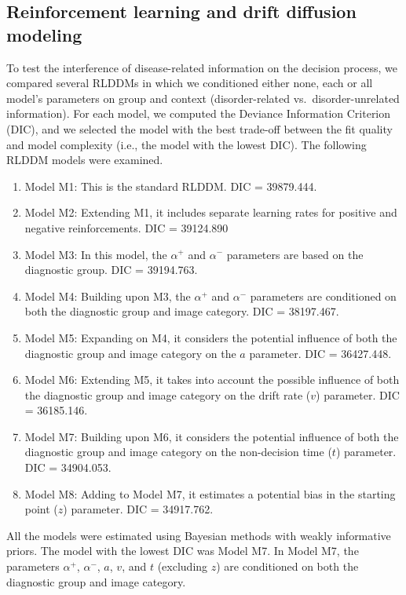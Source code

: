 \documentclass[
  man,floatsintext]{apa6}
\providecommand{\tightlist}{%
  \setlength{\itemsep}{0pt}\setlength{\parskip}{0pt}}
\begin{document}
\hypertarget{reinforcement-learning-and-drift-diffusion-modeling}{%
\subsection{Reinforcement learning and drift diffusion modeling}\label{reinforcement-learning-and-drift-diffusion-modeling}}

To test the interference of disease-related information on the decision process, we compared several RLDDMs in which we conditioned either none, each or all model's parameters on group and context (disorder-related vs.~disorder-unrelated information). For each model, we computed the Deviance Information Criterion (DIC), and we selected the model with the best trade-off between the fit quality and model complexity (i.e., the model with the lowest DIC). The following RLDDM models were examined.

\begin{enumerate}
\def\labelenumi{\arabic{enumi}.}
\tightlist
\item
  Model M1: This is the standard RLDDM. DIC = 39879.444.
\item
  Model M2: Extending M1, it includes separate learning rates for positive and negative reinforcements. DIC = 39124.890
\item
  Model M3: In this model, the \(\alpha^+\) and \(\alpha^-\) parameters are based on the diagnostic group. DIC = 39194.763.
\item
  Model M4: Building upon M3, the \(\alpha^+\) and \(\alpha^-\) parameters are conditioned on both the diagnostic group and image category. DIC = 38197.467.
\item
  Model M5: Expanding on M4, it considers the potential influence of both the diagnostic group and image category on the \(a\) parameter. DIC = 36427.448.
\item
  Model M6: Extending M5, it takes into account the possible influence of both the diagnostic group and image category on the drift rate (\(v\)) parameter. DIC = 36185.146.
\item
  Model M7: Building upon M6, it considers the potential influence of both the diagnostic group and image category on the non-decision time (\(t\)) parameter. DIC = 34904.053.
\item
  Model M8: Adding to Model M7, it estimates a potential bias in the starting point (\(z\)) parameter. DIC = 34917.762.
\end{enumerate}

All the models were estimated using Bayesian methods with weakly informative priors. The model with the lowest DIC was Model M7. In Model M7, the parameters \(\alpha^+\), \(\alpha^-\), \(a\), \(v\), and \(t\) (excluding \(z\)) are conditioned on both the diagnostic group and image category.
\end{document}
